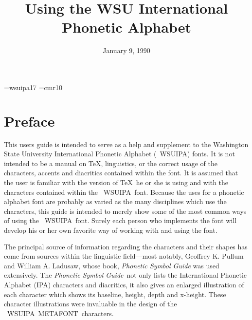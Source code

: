 


\font\smokefont=wsuipa17
\font\mf=cmr10
\def\deg{$^\circ$}

\def\vs #1{\vskip #1}
\def\meta{{\mf METAFONT}}
\def\wsu{{\ WSUIPA}}
\def\ipam{{ IPAMACS}}
\def\PL{{\it Phonetic Symbol Guide}}

\def\pos#1{\vs{10pt}\hrule width 1in\vs{1pt}\hrule width 1in
    \noindent\begin{tabular}{rl}
        \tenbf WSUIPA Char' Position: & #1\\ }
\def\pl#1{\tenbf Pullum \&\ Ladusaw name: & #1\\ }
\def\mac#1{\tenbf IPAMACS Name: & \tt\char'134 #1\\ }
\def\smoke#1{\tenbf IPA Character: & \smokefont\char#1
     \end{tabular}}


\title{ Using the WSU International Phonetic Alphabet}
\author{}  %
\date{January 9, 1990}
\maketitle

\section{Preface}

This users guide is intended to serve as a help and supplement to the
Washington State University International Phonetic Alphabet (\wsu) fonts.
It is not intended to be a manual on \TeX, linguistics, or the correct usage of
the characters, accents and diacritics contained within the font.
It is assumed that the user is familiar with the version of \TeX\ he or she is
using and with the characters contained within the \wsu\ font.
Because the uses for a phonetic alphabet font are probably as varied as the
many disciplines which use the characters, this guide is intended to merely
show some of the most common ways of using the \wsu\ font. Surely each person
who implements the font will develop his or her own favorite way of working with
 and
using the font.

The principal
source of information regarding the characters and their shapes has come from
sources within the linguistic field---most
notably, Geoffrey K. Pullum and William A. Ladusaw, whose book, {\it Phonetic
Symbol Guide} was used extensively.
The \PL\  not only lists the International Phonetic Alphabet (IPA) characters
and diacritics, it also
gives an enlarged illustration of each character which shows its baseline,
height, depth and x-height. These character illustrations were invaluable
in the design of the \wsu\ \meta\ characters.

